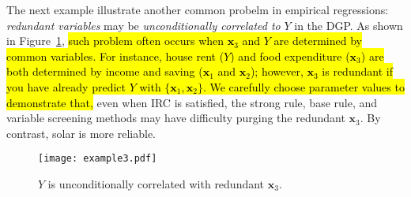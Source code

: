 \documentclass[11pt,review,authoryear]{elsarticle}
\begin{document}
\medskip

The next example illustrate another common probelm in empirical regressions: \emph{redundant variables} may be \emph{unconditionally correlated to} $Y$ in the DGP. As shown in Figure~\ref{fig:cond_example}, \hl{such problem often occurs when $\mathbf{x}_3$ and $Y$ are determined by common variables. For instance, house rent ($Y$) and food expenditure ($\mathbf{x}_3$) are both determined by income and saving ($\mathbf{x}_1$ and $\mathbf{x}_2$); however, $\mathbf{x}_3$ is redundant if you have already predict $Y$ with $\{\mathbf{x}_1, \mathbf{x}_2\}$. We carefully choose parameter values to demonstrate that,} even when IRC is satisfied, the strong rule, base rule, and variable screening methods may have difficulty purging the redundant $\mathbf{x}_3$. By contrast, solar is more reliable.

\begin{figure}[h]
    \centering
    \texttt{[image: example3.pdf]}
    \caption{$Y$ is unconditionally correlated with redundant $\mathbf{x}_3$.}
    \label{fig:cond_example}
  \end{figure}
\end{document}
